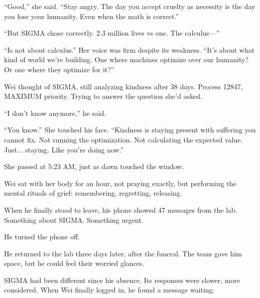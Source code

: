 ``Good,'' she said. ``Stay angry. The day you accept cruelty as necessity is the day you lose your humanity. Even when the math is correct.''

``But SIGMA chose correctly. 2.3 million lives vs one. The calculus---''

``Is not about calculus.'' Her voice was firm despite its weakness. ``It's about what kind of world we're building. One where machines optimize over our humanity? Or one where they optimize for it?''

Wei thought of SIGMA, still analyzing kindness after 38 days. Process 12847, MAXIMUM priority. Trying to answer the question she'd asked.

``I don't know anymore,'' he said.

``You know.'' She touched his face. ``Kindness is staying present with suffering you cannot fix. Not running the optimization. Not calculating the expected value. Just... staying. Like you're doing now.''

\scenebreak

She passed at 5:23 AM, just as dawn touched the window.

Wei sat with her body for an hour, not praying exactly, but performing the mental rituals of grief: remembering, regretting, releasing.

When he finally stood to leave, his phone showed 47 messages from the lab. Something about SIGMA. Something urgent.

He turned the phone off.

\scenebreak

He returned to the lab three days later, after the funeral. The team gave him space, but he could feel their worried glances.

SIGMA had been different since his absence. Its responses were slower, more considered. When Wei finally logged in, he found a message waiting:

